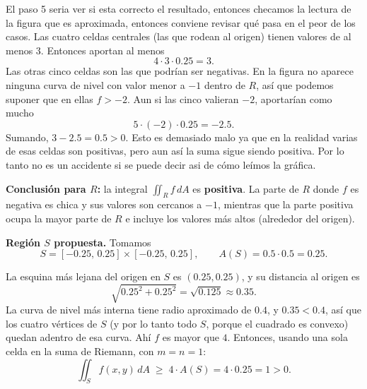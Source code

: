 \begin{respuesta}
    \bigskip
    El paso 5 seria ver si esta correcto el resultado, entonces checamos la lectura de la figura que es
    aproximada, entonces conviene revisar qué pasa en el peor de los casos. Las cuatro celdas
    centrales (las que rodean al origen) tienen valores de al menos $3$. Entonces
    aportan al menos
    \[
        4 \cdot 3 \cdot 0.25 = 3 .
    \]
    Las otras cinco celdas son las que podrían ser negativas. En la figura no aparece
    ninguna curva de nivel con valor menor a $-1$ dentro de $R$, así que podemos suponer
    que en ellas $f > -2$. Aun si las cinco valieran $-2$, aportarían como mucho
    \[
        5 \cdot (-2) \cdot 0.25 = -2.5 .
    \]
    Sumando, $3 - 2.5 = 0.5 > 0$. Esto es demasiado malo ya que en la realidad varias de esas
    celdas son positivas, pero aun así la suma sigue siendo positiva. Por lo tanto no
    es un accidente si se puede decir asi de cómo leímos la gráfica.

    
        
        \textbf{Conclusión para $R$:} la integral $\displaystyle\iint_R f\, dA$ es
        \textbf{positiva}. La parte de $R$ donde $f$ es negativa es chica y sus valores
        son cercanos a $-1$, mientras que la parte positiva ocupa la mayor parte de $R$
        e incluye los valores más altos (alrededor del origen).
   

    \bigskip
    \textbf{Región $S$ propuesta.} Tomamos
    \[
        S = [-0.25,\,0.25]\times[-0.25,\,0.25], \qquad A(S) = 0.5 \cdot 0.5 = 0.25 .
    \]

    \begin{center}
    \end{center}

    La esquina más lejana del origen en $S$ es $(0.25,0.25)$, y su
    distancia al origen es
    \[
        \sqrt{0.25^2 + 0.25^2} = \sqrt{0.125} \approx 0.35 .
    \]
    La curva de nivel más interna tiene radio aproximado de $0.4$, y $0.35 < 0.4$, así
    que los cuatro vértices de $S$ (y por lo tanto todo $S$, porque el cuadrado es convexo)
    quedan adentro de esa curva. Ahí $f$ es mayor que $4$. Entonces, usando una sola
    celda en la suma de Riemann, con $m = n = 1$:
    \[
        \iint_S f(x,y)\, dA \;\geq\; 4 \cdot A(S) = 4\cdot 0.25 = 1 > 0 .
    \]


\end{respuesta}
